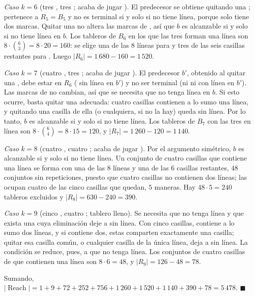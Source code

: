 \emph{Caso $k = 6$} (tres , tres ; acaba de jugar ). El predecesor se obtiene quitando una ; pertenece a $R_5 = B_5$ y no es terminal si y solo si  no tiene línea, porque  solo tiene dos marcas. Quitar una  no altera las marcas de , así que $b$ es alcanzable si y solo si  no tiene línea en $b$. Los tableros de $B_6$ en los que las tres  forman una línea son $8 \cdot \binom{6}{3} = 8 \cdot 20 = 160$: se elige una de las $8$ líneas para  y tres de las seis casillas restantes para . Luego $|R_6| = 1\,680 - 160 = 1\,520$.

\emph{Caso $k = 7$} (cuatro , tres ; acaba de jugar ). El predecesor $b'$, obtenido al quitar una , debe estar en $R_6$ ( sin línea en $b'$) y no ser terminal (ni  ni  con línea en $b'$). Las marcas de  no cambian, así que se necesita que  no tenga línea en $b$. Si esto ocurre, basta quitar una  adecuada: cuatro casillas contienen a lo sumo una línea, y quitando una casilla de ella (o cualquiera, si no la hay)  queda sin línea. Por lo tanto, $b$ es alcanzable si y solo si  no tiene línea. Los tableros de $B_7$ con las tres  en línea son $8 \cdot \binom{6}{4} = 8 \cdot 15 = 120$, y $|R_7| = 1\,260 - 120 = 1\,140$.

\emph{Caso $k = 8$} (cuatro , cuatro ; acaba de jugar ). Por el argumento simétrico, $b$ es alcanzable si y solo si  no tiene línea. Un conjunto de cuatro casillas que contiene una línea se forma con una de las $8$ líneas y una de las $6$ casillas restantes, $48$ conjuntos sin repeticiones, puesto que cuatro casillas no contienen dos líneas; las  ocupan cuatro de las cinco casillas que quedan, $5$ maneras. Hay $48 \cdot 5 = 240$ tableros excluidos y $|R_8| = 630 - 240 = 390$.

\emph{Caso $k = 9$} (cinco , cuatro ; tablero lleno). Se necesita que  no tenga línea y que exista una  cuya eliminación deje a  sin línea. Con cinco casillas,  contiene a lo sumo dos líneas, y si contiene dos, estas comparten exactamente una casilla; quitar esa casilla común, o cualquier casilla de la única línea, deja a  sin línea. La condición se reduce, pues, a que  no tenga línea. Los conjuntos de cuatro casillas de  que contienen una línea son $8 \cdot 6 = 48$, y $|R_9| = 126 - 48 = 78$.

Sumando, $|\operatorname{Reach}| = 1 + 9 + 72 + 252 + 756 + 1\,260 + 1\,520 + 1\,140 + 390 + 78 = 5\,478$. \hfill $\blacksquare$

